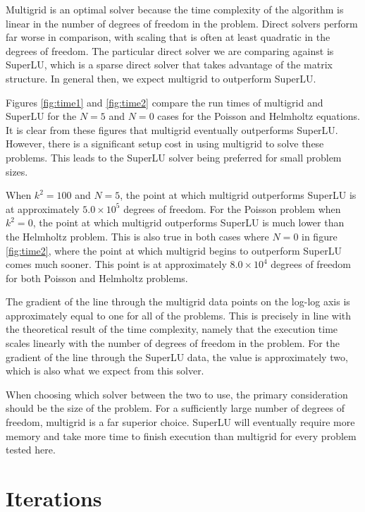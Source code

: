 Multigrid is an optimal solver because the time complexity of the algorithm is linear in the number of degrees of freedom in the problem.
Direct solvers perform far worse in comparison, with scaling that is often at least quadratic in the degrees of freedom.
The particular direct solver we are comparing against is SuperLU, which is a sparse direct solver that takes advantage of the matrix structure.
In general then, we expect multigrid to outperform SuperLU.

Figures \ref{fig:time1} and \ref{fig:time2} compare the run times of multigrid and SuperLU for the $N=5$ and $N=0$ cases for the Poisson and Helmholtz equations.
It is clear from these figures that multigrid eventually outperforms SuperLU.
However, there is a significant setup cost in using multigrid to solve these problems.
This leads to the SuperLU solver being preferred for small problem sizes.

When $k^2=100$ and $N=5$, the point at which multigrid outperforms SuperLU is at approximately $5.0\times 10^5$ degrees of freedom.
For the Poisson problem when $k^2=0$, the point at which multigrid outperforms SuperLU is much lower than the Helmholtz problem.
This is also true in both cases where $N=0$ in figure \ref{fig:time2}, where the point at which multigrid begins to outperform SuperLU comes much sooner.
This point is at approximately $8.0\times 10^4$ degrees of freedom for both Poisson and Helmholtz problems.

The gradient of the line through the multigrid data points on the log-log axis is approximately equal to one for all of the problems.
This is precisely in line with the theoretical result of the time complexity, namely that the execution time scales linearly with the number of degrees of freedom in the problem.
For the gradient of the line through the SuperLU data, the value is approximately two, which is also what we expect from this solver.

When choosing which solver between the two to use, the primary consideration should be the size of the problem.
For a sufficiently large number of degrees of freedom, multigrid is a far superior choice.
SuperLU will eventually require more memory and take more time to finish execution than multigrid for every problem tested here.









\section{Iterations}

